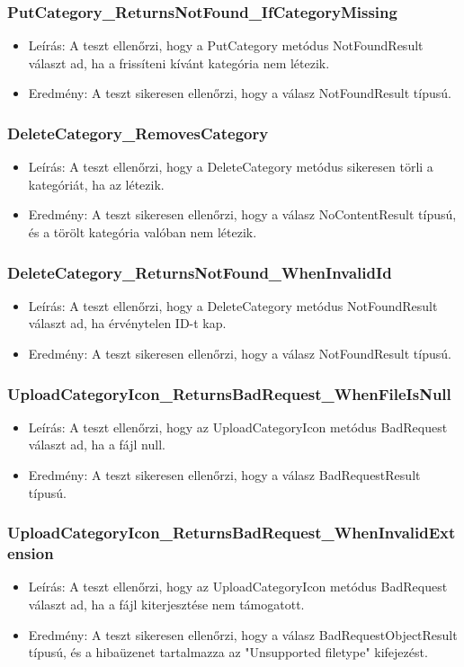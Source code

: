 \documentclass[11pt]{article}
\begin{document}
\subsubsection{PutCategory\_ReturnsNotFound\_IfCategoryMissing}
\label{sec:orgc3471c2}
\begin{itemize}
\item Leírás: A teszt ellenőrzi, hogy a PutCategory metódus NotFoundResult választ ad, ha a frissíteni kívánt kategória nem létezik.
\item Eredmény: A teszt sikeresen ellenőrzi, hogy a válasz NotFoundResult típusú.
\end{itemize}
\subsubsection{DeleteCategory\_RemovesCategory}
\label{sec:org44697a9}
\begin{itemize}
\item Leírás: A teszt ellenőrzi, hogy a DeleteCategory metódus sikeresen törli a kategóriát, ha az létezik.
\item Eredmény: A teszt sikeresen ellenőrzi, hogy a válasz NoContentResult típusú, és a törölt kategória valóban nem létezik.
\end{itemize}
\subsubsection{DeleteCategory\_ReturnsNotFound\_WhenInvalidId}
\label{sec:orgbe97aef}
\begin{itemize}
\item Leírás: A teszt ellenőrzi, hogy a DeleteCategory metódus NotFoundResult választ ad, ha érvénytelen ID-t kap.
\item Eredmény: A teszt sikeresen ellenőrzi, hogy a válasz NotFoundResult típusú.
\end{itemize}
\subsubsection{UploadCategoryIcon\_ReturnsBadRequest\_WhenFileIsNull}
\label{sec:orgcfc27f2}
\begin{itemize}
\item Leírás: A teszt ellenőrzi, hogy az UploadCategoryIcon metódus BadRequest választ ad, ha a fájl null.
\item Eredmény: A teszt sikeresen ellenőrzi, hogy a válasz BadRequestResult típusú.
\end{itemize}
\subsubsection{UploadCategoryIcon\_ReturnsBadRequest\_WhenInvalidExtension}
\label{sec:org2c7b68d}
\begin{itemize}
\item Leírás: A teszt ellenőrzi, hogy az UploadCategoryIcon metódus BadRequest választ ad, ha a fájl kiterjesztése nem támogatott.
\item Eredmény: A teszt sikeresen ellenőrzi, hogy a válasz BadRequestObjectResult típusú, és a hibaüzenet tartalmazza az "Unsupported filetype" kifejezést.
\end{itemize}
\end{document}

